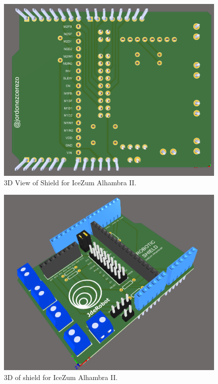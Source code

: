 	\begin{center}
		\begin{figure}[H]
			\center
			\includegraphics[scale=0.6]{imagenes/Balancing_Robot/bottom_3D.PNG}
			\caption{3D View of Shield for IceZum Alhambra II.}
			\label{fig:bottom_3D}
		\end{figure}
	\end{center}
	
	\begin{center}
		\begin{figure}[H]
			\center
			\includegraphics[scale=0.5]{imagenes/Balancing_Robot/Vista3D1.PNG}
			\caption{3D of shield for IceZum Alhambra II.}
			\label{fig:Vista3D1}
		\end{figure}
	\end{center}
	
